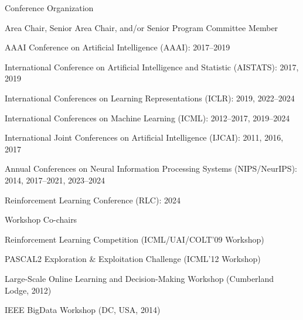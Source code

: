 \documentclass[10pt,twoside,letterpaper]{article}
\newcommand{\negitemspace}{\vspace{1mm}}
\begin{document}
\begin{compactitem}

\item{Conference Organization} \negitemspace

\begin{compactitem}

\item{Area Chair, Senior Area Chair, and/or Senior Program Committee Member}

\begin{compactitem}

\item{AAAI Conference on Artificial Intelligence (AAAI): 2017--2019}

\item{International Conference on Artificial Intelligence and Statistic (AISTATS): 2017, 2019}

\item{International Conferences on Learning Representations (ICLR): 2019, 2022--2024}

\item{International Conferences on Machine Learning (ICML): 2012--2017, 2019--2024}

\item{International Joint Conferences on Artificial Intelligence (IJCAI): 2011, 2016, 2017}

\item{Annual Conferences on Neural Information Processing Systems (NIPS/NeurIPS): 2014, 2017--2021, 2023--2024}

\item{Reinforcement Learning Conference (RLC): 2024}

\end{compactitem}

\item{Workshop Co-chairs}

\begin{compactitem}

\item{Reinforcement Learning Competition
(ICML/UAI/COLT'09 Workshop)}

\item{PASCAL2 Exploration \& Exploitation Challenge (ICML'12 Workshop)}

\item{Large-Scale Online Learning and Decision-Making Workshop (Cumberland Lodge, 2012)}

\item{IEEE BigData Workshop (DC, USA, 2014)}


\end{compactitem}
\end{compactitem}
\end{compactitem}
\end{document}
